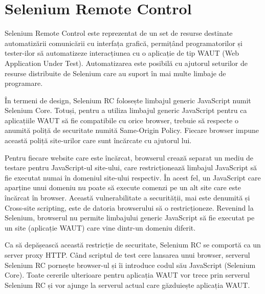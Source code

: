 \documentclass[12pt]{book}
\begin{document}
\section{Selenium Remote Control}

Selenium Remote Control este reprezentat de un set de resurse destinate automatizării  comunicării cu interfața grafică, permițând programatorilor și tester-ilor să automatizeze interacțiunea cu o aplicație de tip WAUT (Web Application Under Test). Automatizarea este posibilă cu ajutorul seturilor de resurse distribuite de Selenium care au suport în mai multe limbaje de programare.

În termeni de design, Selenium RC folosește limbajul generic JavaScript numit Selenium Core. Totuși, pentru a utiliza limbajul generic JavaScript pentru ca aplicațiile WAUT să fie compatibile cu orice browser, trebuie să respecte o anumită poliță de securitate numită Same-Origin Policy. Fiecare browser impune această poliță site-urilor care sunt încărcate cu ajutorul lui. 

Pentru fiecare website care este încărcat, browserul crează separat un mediu de testare pentru JavaScript-ul site-ului, care restricționează limbajul JavaScript să fie executat numai în domeniul site-ului respectiv. În acest fel, un JavaScript care aparține unui domeniu nu poate să execute comenzi pe un alt site care este încărcat în browser. Această vulnerabilitate a securității, mai este denumită și Cross-site scripting, este de datoria browserului să o restricționeze. Revenind la Selenium, browserul nu permite limbajului generic JavaScript să fie executat pe un site (aplicație WAUT) care vine dintr-un domeniu diferit.

Ca să depășească această restricție de securitate, Selenium RC se comportă ca un server proxy HTTP. Când scriptul de test cere lansarea unui browser, serverul Selenium RC pornește browser-ul și îi introduce codul său JavaScript (Selenium Core). Toate cererile ulterioare pentru aplicația WAUT vor trece prin serverul Selenium RC și vor ajunge la serverul actual care găzduiește aplicația WAUT. \cite{SeleniumBook}
\end{document}
